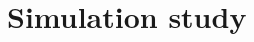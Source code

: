 \documentclass[11pt]{article}
\theoremstyle{plain}
\theoremstyle{definition}
\theoremstyle{remark}
\newcommand{\betahat}{\widehat{\beta}}
\newcommand{\gps}{e}
\newcommand{\score}{S}
\begin{document}
%
%
%
%
\section{Simulation study}
\label{sec:simulation}
\end{document}
